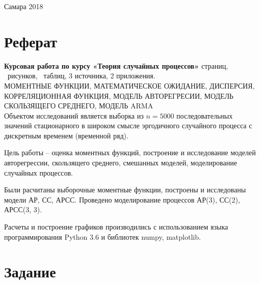 \documentclass[12pt, fleqn]{article}
\begin{document}
\begin{titlepage}
						
							
	\vfill\vfill\vfill
					
	{\centering Самара 2018}
							
							
\end{titlepage}
\setcounter{page}{2}
\newpage
\section*{Реферат}
{
	\textbf{Курсовая работа по курсу «Теория случайных процессов»} 
	\pageref{LastPage} страниц,
	\totalfigures\ рисунков,
	\totaltables\ таблиц,
	3 источника,
	2 приложения.\\
				
	МОМЕНТНЫЕ ФУНКЦИИ, МАТЕМАТИЧЕСКОЕ ОЖИДАНИЕ, ДИСПЕРСИЯ, КОРРЕЛЯЦИОННАЯ ФУНКЦИЯ, МОДЕЛЬ АВТОРЕГРЕСИИ, МОДЕЛЬ СКОЛЬЗЯЩЕГО СРЕДНЕГО, МОДЕЛЬ ARMA\\
						  
	Объектом исследований является выборка из $n = 5000$ последовательных значений стационарного в широком смысле эргодичного случайного процесса с дискретным временем (временной ряд).
						  
	Цель работы -- оценка моментных функций, построение и исследование моделей авторегрессии, скользящего среднего, смешанных моделей, моделирование случайных процессов.
						  
	Были расчитаны выборочные моментные функции, построены и исследованы модели АР, СС, АРСС. Проведено моделирование процессов АР(3), СС(2), АРСС(3, 3).
	
	Расчеты и построение графиков производились с использованием языка программирования Python 3.6 и библиотек numpy, matplotlib. 
}



\newpage
\tableofcontents
\newpage


\newpage
\section{Задание}
\end{document}
